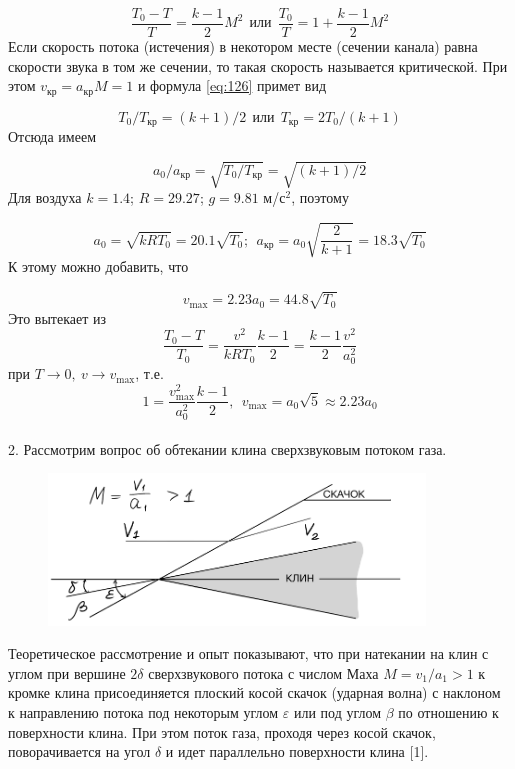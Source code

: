 \documentclass[specialist, subf, href, colorlinks=true, 14pt, final]{disser}
\theoremstyle{definition}
\begin{document}
\begin{equation}\label{eq:126}
  \frac{T_{0}-T}{T} = \frac{k-1}{2}M^{2}\ \ \text{или}\ \ \frac{T_0}{T} = 1 + \frac{k-1}{2}M^{2}
  \tag{6}
\end{equation}
Если скорость потока (истечения) в некотором месте (сечении канала) равна скорости звука в том же сечении, то такая скорость называется критической. При этом $v_{\text{кр}} = a_{\text{кр}}M = 1$ и формула \eqref{eq:126} примет вид
\addtocounter{equation}{1}
\begin{equation}\label{eq:127}
  T_{0}/T_{\text{кр}} = (k+1)/2\ \ \text{или}\ \ T_{\text{кр}} = 2T_{0}/(k+1)
  \tag{7}
\end{equation}
Отсюда имеем
\addtocounter{equation}{1}
\begin{equation}\label{eq:128}
  a_{0}/a_{\text{кр}} = \sqrt{T_{0}/T_{\text{кр}}} = \sqrt{(k+1)/2}
  \tag{8}
\end{equation}
Для воздуха $k = 1.4$; $R = 29.27$; $g = 9.81$ м/с$^2$, поэтому
\addtocounter{equation}{1}
\begin{equation}\label{eq:129}
  a_{0} = \sqrt{kRT_0} = 20.1\sqrt{T_0};\ \ a_{\text{кр}} = a_{0}\sqrt{\frac{2}{k+1}} = 18.3\sqrt{T_0} 
  \tag{9}
\end{equation}
К этому можно добавить, что 
\addtocounter{equation}{1}
\begin{equation}\label{eq:1210}
  v_{\text{max}} = 2.23a_{0} = 44.8\sqrt{T_0}
  \tag{10}
\end{equation}
Это вытекает из
\[
  \frac{T_{0}-T}{T_{0}} = \frac{v^2}{kRT_0}\frac{k-1}{2} = \frac{k-1}{2}\frac{v^2}{a_{0}^{2}}
\]
при $T\rightarrow 0,\ v\rightarrow v_{\text{max}}$, т.е.
\[
  1 = \frac{v_{\text{max}}^{2}}{a_{0}^{2}}\frac{k-1}{2},\ \ v_{\text{max}} = a_{0}\sqrt{5} \approx 2.23a_0
\]
\\
2. Рассмотрим вопрос об обтекании клина сверхзвуковым потоком газа.
\begin{figure} 
  \includegraphics[width=100mm]{pics/1-2-1.png}
  \caption{}
  \label{1-2-1}
\end{figure}
Теоретическое рассмотрение и опыт показывают, что при натекании на клин с углом при вершине $2\delta$ сверхзвукового потока с числом Маха $M = v_{1}/a_{1} > 1$ к кромке клина присоединяется плоский косой скачок (ударная волна) с наклоном к направлению потока под некоторым углом $\varepsilon$ или под углом $\beta$ по отношению к поверхности клина. При этом поток газа, проходя через косой скачок, поворачивается на угол $\delta$ и идет параллельно поверхности клина [1].\\
\end{document}
